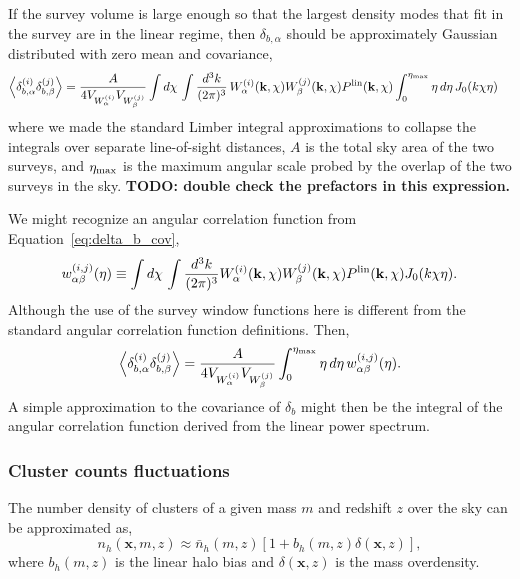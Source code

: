 \documentclass[preprint]{aastex}
\newcommand{\kv}{\mathbf{k}}
\newcommand{\xv}{\mathbf{x}}
\newcommand{\nbar}{\bar{n}}
\begin{document}
If the survey volume is large enough so that the 
largest density modes that fit in the survey are in the linear regime, 
then $\delta_{b,\alpha}$ should be approximately Gaussian distributed 
with zero mean and covariance,
\begin{align}\label{eq:delta_b_cov}
	\left<\delta_{b,\alpha}^{(i)} \delta_{b,\beta}^{(j)}\right> &=
	\frac{A}{4V_{W_{\alpha}^{(i)}} V_{W_{\beta}^{(j)}}}
	\int d\chi\, 
	\int \frac{d^{3}k}{(2\pi)^3}\,
	W^{(i)}_{\alpha}(\kv, \chi) W^{(j)}_{\beta}(\kv,\chi) P^{\rm lin}(\kv,\chi) 
	\int_{0}^{\eta_{\rm max}} \eta\, d\eta\, J_{0}(k\chi\eta)
\end{align}
where we made the standard Limber integral approximations to collapse the 
integrals over separate line-of-sight distances, $A$ is the total sky area of the 
two surveys, and $\eta_{\rm max}$ is the maximum angular scale probed by the 
overlap of the two surveys in the sky.
{\bf TODO: double check the prefactors in this expression.}

We might recognize an angular correlation function from Equation~\ref{eq:delta_b_cov},
\begin{equation}
	w_{\alpha\beta}^{(i,j)}(\eta) \equiv 
	\int d\chi\, \int \frac{d^3k}{(2\pi)^3}
	W^{(i)}_{\alpha}(\kv, \chi) W^{(j)}_{\beta}(\kv,\chi) P^{\rm lin}(\kv,\chi) J_{0}(k\chi\eta).
\end{equation}
Although the use of the survey window functions here is  different 
from the standard angular correlation function definitions.
Then,
\begin{equation}
	\left<\delta_{b,\alpha}^{(i)} \delta_{b,\beta}^{(j)}\right> =
	\frac{A}{4V_{W_{\alpha}^{(i)}} V_{W_{\beta}^{(j)}}}
	\int_{0}^{\eta_{\rm max}} \eta\,d\eta\, w^{(i,j)}_{\alpha\beta}(\eta).
\end{equation}
A simple approximation to the covariance of $\delta_b$ might then be 
the integral of the angular correlation function derived from the linear 
power spectrum.



\subsubsection{Cluster counts fluctuations}
The number density of clusters of a given mass $m$ and redshift $z$ over the 
sky can be approximated as,
\begin{equation}
	n_{h}(\xv, m, z) \approx \nbar_{h}(m, z)
	\left[1 + b_{h}(m,z) \delta(\xv, z)\right],
\end{equation}
where $b_{h}(m,z)$ is the linear halo bias and
$\delta(\xv,z)$ is the mass overdensity.
\end{document}
